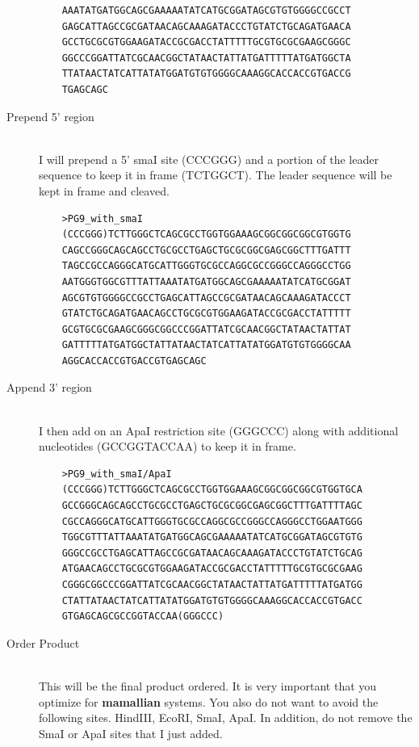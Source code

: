 \begin{description}
\begin{verbatim}
    AAATATGATGGCAGCGAAAAATATCATGCGGATAGCGTGTGGGGCCGCCT
    GAGCATTAGCCGCGATAACAGCAAAGATACCCTGTATCTGCAGATGAACA
    GCCTGCGCGTGGAAGATACCGCGACCTATTTTTGCGTGCGCGAAGCGGGC
    GGCCCGGATTATCGCAACGGCTATAACTATTATGATTTTTATGATGGCTA
    TTATAACTATCATTATATGGATGTGTGGGGCAAAGGCACCACCGTGACCG
    TGAGCAGC
    \end{verbatim}
  \item[Prepend 5' region] \hfill \\
  I will prepend a 5' smaI site (CCCGGG) and a portion of the leader sequence to keep it in frame (TCTGGCT). The leader sequence will be kept in frame and cleaved.
    \begin{verbatim}
    >PG9_with_smaI
    (CCCGGG)TCTTGGGCTCAGCGCCTGGTGGAAAGCGGCGGCGGCGTGGTG
    CAGCCGGGCAGCAGCCTGCGCCTGAGCTGCGCGGCGAGCGGCTTTGATTT
    TAGCCGCCAGGGCATGCATTGGGTGCGCCAGGCGCCGGGCCAGGGCCTGG
    AATGGGTGGCGTTTATTAAATATGATGGCAGCGAAAAATATCATGCGGAT
    AGCGTGTGGGGCCGCCTGAGCATTAGCCGCGATAACAGCAAAGATACCCT
    GTATCTGCAGATGAACAGCCTGCGCGTGGAAGATACCGCGACCTATTTTT
    GCGTGCGCGAAGCGGGCGGCCCGGATTATCGCAACGGCTATAACTATTAT
    GATTTTTATGATGGCTATTATAACTATCATTATATGGATGTGTGGGGCAA
    AGGCACCACCGTGACCGTGAGCAGC
    \end{verbatim}
   \item[Append 3' region] \hfill \\
   I then add on an ApaI restriction site (GGGCCC) along with additional nucleotides (GCCGGTACCAA) to keep it in frame.
    \begin{verbatim}
    >PG9_with_smaI/ApaI
    (CCCGGG)TCTTGGGCTCAGCGCCTGGTGGAAAGCGGCGGCGGCGTGGTGCA
    GCCGGGCAGCAGCCTGCGCCTGAGCTGCGCGGCGAGCGGCTTTGATTTTAGC
    CGCCAGGGCATGCATTGGGTGCGCCAGGCGCCGGGCCAGGGCCTGGAATGGG
    TGGCGTTTATTAAATATGATGGCAGCGAAAAATATCATGCGGATAGCGTGTG
    GGGCCGCCTGAGCATTAGCCGCGATAACAGCAAAGATACCCTGTATCTGCAG
    ATGAACAGCCTGCGCGTGGAAGATACCGCGACCTATTTTTGCGTGCGCGAAG
    CGGGCGGCCCGGATTATCGCAACGGCTATAACTATTATGATTTTTATGATGG
    CTATTATAACTATCATTATATGGATGTGTGGGGCAAAGGCACCACCGTGACC
    GTGAGCAGCGCCGGTACCAA(GGGCCC)
    \end{verbatim}
   \item[Order Product] \hfill \\
   This will be the final product ordered. It is very important that you optimize for \textbf{mamallian} systems. You also do not want to avoid the following sites. HindIII, EcoRI, SmaI, ApaI. In addition, do not remove the SmaI or ApaI sites that I just added.
\end{description}

